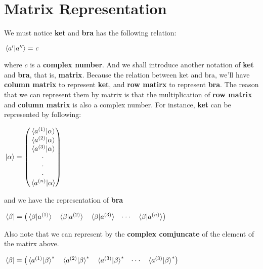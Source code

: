 \documentclass[12pt]{article}
\begin{document}
\section{Matrix Representation}
We must notice \textbf{ket} and \textbf{bra} has the following relation:
\begin{center}
$\braket*{a'}{a''} = \mathit{c}$
\end{center}
where $c$ is a \textbf{complex number}.
And we shall introduce another notation of \textbf{ket} and \textbf{bra}, that is, \textbf{matrix}.
Because the relation between ket and bra, we'll have \textbf{column matrix} to represent \textbf{ket},
and \textbf{row matirx} to represent \textbf{bra}.
The reason that we can represent them by matrix is that the multiplication of \textbf{row matrix} and \textbf{column matrix} is also a complex number.
For instance, \textbf{ket} can be represented by following:
\begin{center}
$\ket*{\alpha } = \begin{pmatrix}
                  \braket*{a^{(1)}}{\alpha }\\
                  \braket*{a^{(2)}}{\alpha }\\
                  \braket*{a^{(3)}}{\alpha }\\
                  \cdot\\
                  \cdot\\
                  \cdot\\
                  \braket*{a^{(n)}}{\alpha }\\
                  \end{pmatrix}$
\end{center}
and we have the representation of \textbf{bra}
\begin{center}
    $\bra*{\beta } = \begin{pmatrix}
                     \braket*{\beta }{a^{(1)}} & \braket*{\beta }{a^{(2)}}& \braket*{\beta }{a^{(3)}} & \cdot\cdot\cdot & \braket*{\beta }{a^{(n)}}
                     \end{pmatrix}$
\end{center}
Also note that we can represent by the \textbf{complex comjuncate} of the element of the matirx above.
\begin{center}
    $\bra*{\beta } = \begin{pmatrix}
                     \braket*{a^{(1)}}{\beta}^{*} & \braket*{a^{(2)}}{\beta}^{*}& \braket*{a^{(3)}}{\beta}^{*}& \cdot\cdot\cdot & \braket*{a^{(3)}}{\beta}^{*}
                     \end{pmatrix}$
\end{center}
\end{document}
